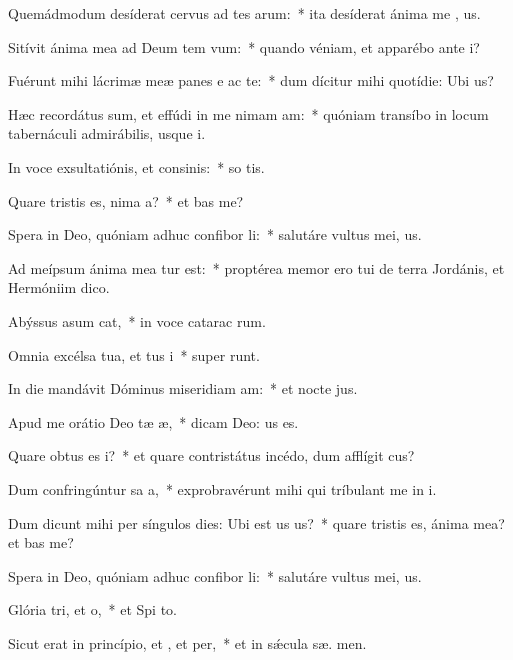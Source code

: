 \item Quemádmodum desíderat cervus ad tes arum:~* ita desíderat ánima me  , us.
\item Sitívit ánima mea ad Deum tem vum:~* quando véniam, et apparébo ante  i?
\item Fuérunt mihi lácrimæ meæ panes e ac te:~* dum dícitur mihi quotídie: Ubi   us?
\item Hæc recordátus sum, et effúdi in me nimam am:~* quóniam transíbo in locum tabernáculi admirábilis, usque   i.
\item In voce exsultatiónis, et consinis:~* so tis.
\item Quare tristis es, nima a?~* et  bas me?
\item Spera in Deo, quóniam adhuc confibor li:~* salutáre vultus mei,   us.
\item Ad meípsum ánima mea tur est:~* proptérea memor ero tui de terra Jordánis, et Hermóniim   dico.
\item Abýssus asum cat,~* in voce catarac rum.
\item Omnia excélsa tua, et tus i~* super  runt.
\item In die mandávit Dóminus miseridiam am:~* et nocte  jus.
\item Apud me orátio Deo tæ æ,~* dicam Deo:  us es.
\item Quare obtus es i?~* et quare contristátus incédo, dum afflígit  cus?
\item Dum confringúntur sa a,~* exprobravérunt mihi qui tríbulant me in i.
\item Dum dicunt mihi per síngulos dies: Ubi est us us?~* quare tristis es, ánima mea? et  bas me?
\item Spera in Deo, quóniam adhuc confibor li:~* salutáre vultus mei,   us.
\item Glória tri, et o,~* et Spi to.
\item Sicut erat in princípio, et , et per,~* et in sǽcula sæ. men.
